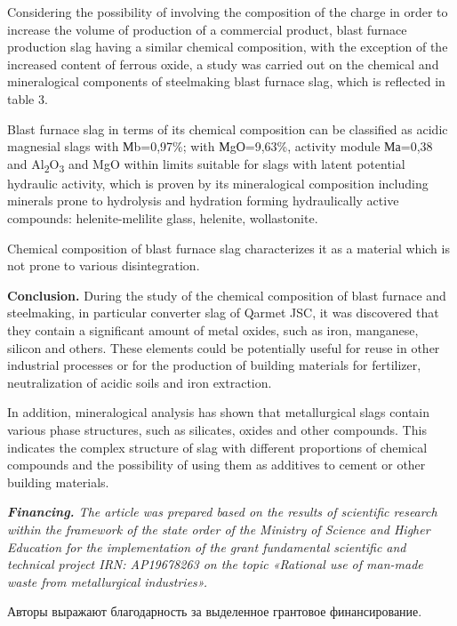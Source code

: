 \begin{multicols}{2}
Considering the possibility of involving the composition of the charge
in order to increase the volume of production of a commercial product,
blast furnace production slag having a similar chemical composition,
with the exception of the increased content of ferrous oxide, a study
was carried out on the chemical and mineralogical components of
steelmaking blast furnace slag, which is reflected in table 3.

Blast furnace slag in terms of its chemical composition can be
classified as acidic magnesial slags with Мb=0,97\%; with МgО=9,63\%,
activity module Ма=0,38 and Al\textsubscript{2}O\textsubscript{3} and
MgO within limits suitable for slags with latent potential hydraulic
activity, which is proven by its mineralogical composition including
minerals prone to hydrolysis and hydration forming hydraulically active
compounds: helenite-melilite glass, helenite, wollastonite.

Chemical composition of blast furnace slag characterizes it as a
material which is not prone to various disintegration.

{\bfseries Conclusion.} During the study of the chemical composition of
blast furnace and steelmaking, in particular converter slag of Qarmet
JSC, it was discovered that they contain a significant amount of metal
oxides, such as iron, manganese, silicon and others. These elements
could be potentially useful for reuse in other industrial processes or
for the production of building materials for fertilizer, neutralization
of acidic soils and iron extraction.

In addition, mineralogical analysis has shown that metallurgical slags
contain various phase structures, such as silicates, oxides and other
compounds. This indicates the complex structure of slag with different
proportions of chemical compounds and the possibility of using them as
additives to cement or other building materials.

\emph{{\bfseries Financing.} The article was prepared based on the results
of scientific research within the framework of the state order of the
Ministry of Science and Higher Education for the implementation of the
grant fundamental scientific and technical project IRN: AP19678263 on
the topic «Rational use of man-made waste from metallurgical
industries».}

Авторы выражают благодарность за выделенное грантовое финансирование.
\end{multicols}

